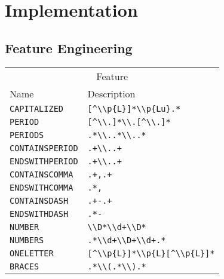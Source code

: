 \chapter{Implementation}\label{app:cha-implementation}
\section{Feature Engineering}\label{app:sec-feature-engineering}

\begin{table}[h!]
\centering
\begin{tabular}{l l}
  \toprule
  \multicolumn{2}{c}{Feature}\\
   Name                   & Description\\
  \midrule
   \texttt{CAPITALIZED}     &\verb$[^\\p{L}]*\\p{Lu}.*$\\
   \texttt{PERIOD}          &\verb$[^\\.]*\\.[^\\.]*$\\
   \texttt{PERIODS}         &\verb$.*\\..*\\..*$\\
   \texttt{CONTAINSPERIOD}  &\verb$.+\\..+$\\
   \texttt{ENDSWITHPERIOD}  &\verb$.+\\..+$\\
   \texttt{CONTAINSCOMMA}   &\verb$.+,.+$\\
   \texttt{ENDSWITHCOMMA}   &\verb$.*,$\\
   \texttt{CONTAINSDASH}    &\verb$.+-.+$\\
   \texttt{ENDSWITHDASH}    &\verb$.*-$\\
   \texttt{NUMBER}          &\verb$\\D*\\d+\\D*$\\
   \texttt{NUMBERS}         &\verb$.*\\d+\\D+\\d+.*$\\
   \texttt{ONELETTER}       &\verb$[^\\p{L}]*\\p{L}[^\\p{L}]*$\\
   \texttt{BRACES}          &\verb$.*\\(.*\\).*$\\

\end{tabular}
\end{table}
